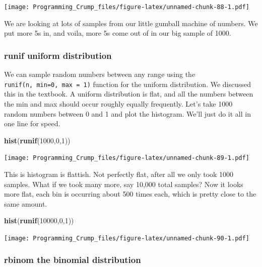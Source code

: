\documentclass[]{book}
\newenvironment{Shaded}{\begin{snugshade}}{\end{snugshade}}
\newcommand{\KeywordTok}[1]{\textcolor[rgb]{0.13,0.29,0.53}{\textbf{{#1}}}}
\newcommand{\DecValTok}[1]{\textcolor[rgb]{0.00,0.00,0.81}{{#1}}}
\newcommand{\NormalTok}[1]{{#1}}
\theoremstyle{definition}
\theoremstyle{definition}
\theoremstyle{definition}
\theoremstyle{remark}
\begin{document}
\texttt{[image: Programming\_Crump\_files/figure-latex/unnamed-chunk-88-1.pdf]}

We are looking at lots of samples from our little gumball machine of
numbers. We put more 5s in, and voila, more 5s come out of in our big
sample of 1000.

\subsubsection{runif uniform
distribution}\label{runif-uniform-distribution}

We can sample random numbers between any range using the
\texttt{runif(n,\ min=0,\ max\ =\ 1)} function for the uniform
distribution. We discussed this in the textbook. A uniform distribution
is flat, and all the numbers between the min and max should occur
roughly equally frequently. Let's take 1000 random numbers between 0 and
1 and plot the histogram. We'll just do it all in one line for speed.

\begin{Shaded}
\begin{Highlighting}[]
\KeywordTok{hist}\NormalTok{(}\KeywordTok{runif}\NormalTok{(}\DecValTok{1000}\NormalTok{,}\DecValTok{0}\NormalTok{,}\DecValTok{1}\NormalTok{))}
\end{Highlighting}
\end{Shaded}

\texttt{[image: Programming\_Crump\_files/figure-latex/unnamed-chunk-89-1.pdf]}

This is histogram is flattish. Not perfectly flat, after all we only
took 1000 samples. What if we took many more, say 10,000 total samples?
Now it looks more flat, each bin is occurring about 500 times each,
which is pretty close to the same amount.

\begin{Shaded}
\begin{Highlighting}[]
\KeywordTok{hist}\NormalTok{(}\KeywordTok{runif}\NormalTok{(}\DecValTok{10000}\NormalTok{,}\DecValTok{0}\NormalTok{,}\DecValTok{1}\NormalTok{))}
\end{Highlighting}
\end{Shaded}

\texttt{[image: Programming\_Crump\_files/figure-latex/unnamed-chunk-90-1.pdf]}

\subsubsection{rbinom the binomial
distribution}\label{rbinom-the-binomial-distribution}
\end{document}
